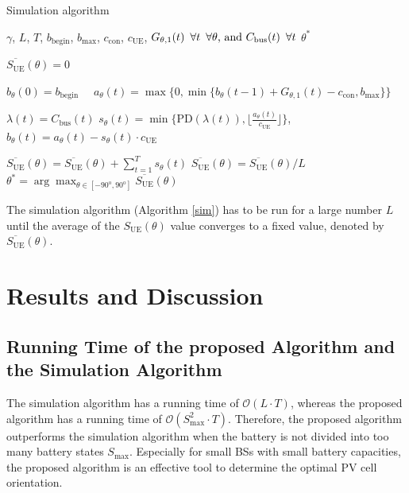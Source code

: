 \begin{algorithm} [H]                     
\caption{Simulation algorithm\label{sim}}     
\label{alg2}                    
\begin{algorithmic} [1] 
          
    \Require $\gamma$, $L$, $T$, $b_{\mathrm{begin}}$, $b_{\max}$, $c_{\mathrm{con}}$, $c_{\mathrm{UE}}$, $G_{\theta,1}(t) \enskip \forall t\enskip\forall \theta  \text{, and } C_{\mathrm{bus}}(t) \enskip \forall t$  
   \Ensure $\theta^*$
	\item[]
	   \State  $\overline{S_{\mathrm{UE}}}(\theta)=0$
				\item[]
					\State {} 
\State $b_\theta(0)=b_{\mathrm{begin}}\quad$
							\State {}
        \State $a_\theta(t)=\max\{0,\min\{b_\theta(t-1)+G_{\theta,1}(t)-c_{\mathrm{con}},b_{\max}\}\}$ \label{h_sim}
			\item[]
			\State {} 
			\State $\lambda(t)=C_{\mathrm{bus}}(t)$  \label{c_sim}
			\State	$s_\theta(t)=\min\{\mathrm{PD}(\lambda(t)),\lfloor \frac{a_\theta(t)}{c_{\mathrm{UE}}}\rfloor\}$,
	\State $b_\theta(t)=a_\theta(t)-s_\theta(t)\cdot c_{\mathrm{UE}}$ 
		\EndFor
		

		\State $\overline{S_{\mathrm{UE}}}(\theta)=\overline{S_{\mathrm{UE}}}(\theta)+\sum_{t=1}^{T} s_\theta(t)$
		\EndFor 			 
\State $\overline{S_{\mathrm{UE}}}(\theta)= \overline{S_{\mathrm{UE}}}(\theta)/L$
\EndFor
		\Return $\theta^*=\arg \displaystyle\max_{\theta\in[-90^{\mathrm{o}},90^{\mathrm{o}}]} \overline{S_{\mathrm{UE}}}(\theta)$
\end{algorithmic}
\end{algorithm}


The simulation algorithm (Algorithm \ref{sim}) has to be run for a large number $L$ until the average of the $S_{\mathrm{UE}}(\theta)$ value converges to a fixed value, denoted by $\overline{S_{\mathrm{UE}}}(\theta)$. 

\section{Results and Discussion\label{results_system_2}}



\subsection{Running Time of the proposed Algorithm and the Simulation Algorithm\label{n}}
The simulation algorithm has a running time of $\mathcal{O}(L \cdot T)$, whereas the proposed algorithm has a running time of $\mathcal{O}(S_{\max}^2 \cdot T)$. Therefore, the proposed algorithm outperforms the simulation algorithm when the battery is not divided into too many battery states $S_{\max}$. Especially for small BSs with small battery capacities, the proposed algorithm is an effective tool to determine the optimal PV cell orientation. 


